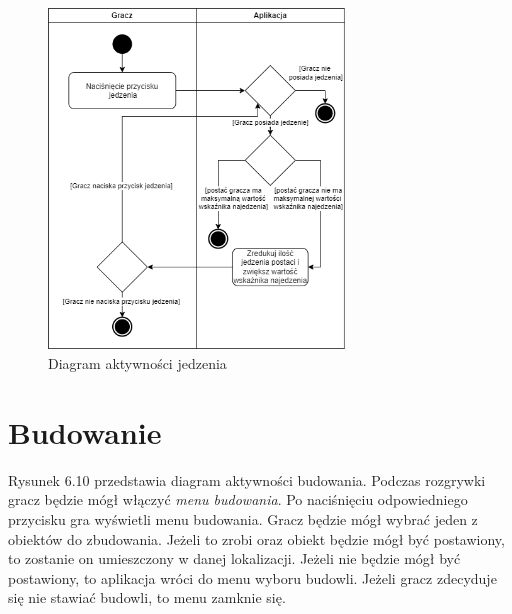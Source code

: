 \begin{figure}[H]
    \centering
        \includegraphics[width=0.7\textwidth]{Graphics/activities/eat.png}
         \caption{Diagram aktywności jedzenia}
\end{figure}

\clearpage

\section{Budowanie}

Rysunek 6.10 przedstawia diagram aktywności budowania.
Podczas rozgrywki gracz będzie mógł włączyć \textit{menu budowania}. Po naciśnięciu odpowiedniego przycisku gra wyświetli menu budowania. Gracz będzie mógł wybrać jeden z obiektów do zbudowania. Jeżeli to zrobi oraz obiekt będzie mógł być postawiony, to zostanie on umieszczony w danej lokalizacji. Jeżeli nie będzie mógł być postawiony, to aplikacja wróci do menu wyboru budowli. Jeżeli gracz zdecyduje się nie stawiać budowli, to menu zamknie się.

